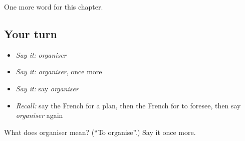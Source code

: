 \begin{grammarlens}[title={What you've built}]
One more word for this chapter.
\end{grammarlens}

\subsection*{Your turn}
\begin{itemize}
\raggedright
  \item \emph{Say it:} \emph{organiser}
  \item \emph{Say it:} \emph{organiser}, once more
  \item \emph{Say it:} say \emph{organiser}
  \item \emph{Recall:} say the French for a plan, then the French for to foresee, then say \emph{organiser} again
\end{itemize}

\begin{tcolorbox}[breakable,colback=teal!4,colframe=teal!35!black,title={Before you move on}]
What does organiser mean? (\textquotedblleft{}To organise\textquotedblright{}.) Say it once more.
\end{tcolorbox}
